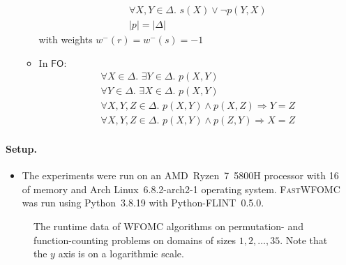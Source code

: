 \documentclass{article}
\theoremstyle{definition}
\newcommand{\FO}{$\mathsf{FO}$}
\begin{document}
\begin{itemize}
\begin{itemize}
\begin{gather*}
                  \forall X, Y \in \Delta\text{. } s(X) \lor \neg p(Y, X)\\
                  |p| = |\Delta|
                \end{gather*}
                with weights $w^{-}(r) = w^{-}(s) = -1$
          \item In \FO:
                \begin{gather*}
                  \forall X \in \Delta\text{. }\exists Y \in \Delta\text{. } p(X, Y)\\
                  \forall Y \in \Delta\text{. }\exists X \in \Delta\text{. } p(X, Y)\\
                  \forall X, Y, Z \in \Delta\text{. } p(X, Y) \land p(X, Z) \Rightarrow Y = Z\\
                  \forall X, Y, Z \in \Delta\text{. } p(X, Y) \land p(Z, Y) \Rightarrow X = Z
                \end{gather*}
        \end{itemize}
\end{itemize}

\paragraph{Setup.}
\begin{itemize}
  \item The experiments were run on an AMD~Ryzen~7~5800H processor with
        \SI{16}{\gibi\byte} of memory and Arch Linux~6.8.2-arch2-1 operating
        system. \textsc{FastWFOMC} was run using Python~3.8.19 with
        Python-FLINT~0.5.0.
\end{itemize}

\begin{figure}
  \centering
  
  \caption{The runtime data of WFOMC algorithms on permutation- and
    function-counting problems on domains of sizes $1, 2, \dots, 35$. Note that
    the $y$ axis is on a logarithmic scale.}\label{fig:plot}
\end{figure}
\end{document}
